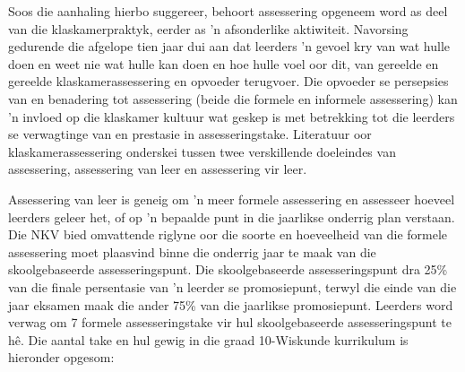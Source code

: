 Soos die aanhaling hierbo suggereer, behoort assessering opgeneem word as deel van die klaskamerpraktyk, eerder as 'n afsonderlike aktiwiteit. Navorsing gedurende die afgelope tien jaar dui aan dat leerders 'n gevoel kry van wat hulle doen en weet nie wat hulle kan doen en hoe hulle voel oor dit, van gereelde en gereelde klaskamerassessering en opvoeder terugvoer. Die opvoeder se persepsies van en benadering tot assessering (beide die formele en informele assessering) kan 'n invloed op die klaskamer kultuur wat geskep is met betrekking tot die leerders se verwagtinge van en prestasie in assesseringstake. Literatuur oor klaskamerassessering onderskei tussen twee verskillende doeleindes van assessering, assessering van leer en assessering vir leer.

Assessering van leer is geneig om 'n meer formele assessering en assesseer hoeveel leerders geleer het, of op 'n bepaalde punt in die jaarlikse onderrig plan verstaan. Die NKV bied omvattende riglyne oor die soorte en hoeveelheid van die formele assessering moet plaasvind binne die onderrig jaar te maak van die skoolgebaseerde assesseringspunt. Die skoolgebaseerde assesseringspunt dra 25\% van die finale persentasie van 'n leerder se promosiepunt, terwyl die einde van die jaar eksamen maak die ander 75\% van die jaarlikse promosiepunt. Leerders word verwag om 7 formele assesseringstake vir hul skoolgebaseerde assesseringspunt te h\^{e}. Die aantal take en hul gewig in die graad 10-Wiskunde kurrikulum is hieronder opgesom:


